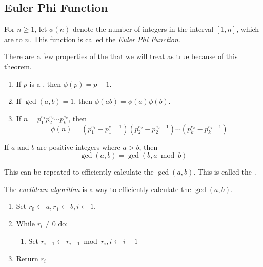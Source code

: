 \subsection{Euler Phi Function}\label{subsec:Euler_Phi_Function}
\begin{definition}\label{def:Euler_Phi_Function}
  For $n \geq 1$, let $\phi(n)$ denote the number of integers in the interval $[1, n]$, which are  to $n$.
  This function is called the \emph{Euler Phi Function}.
\end{definition}
\begin{theorem}\label{thm:Euler_Phi_Function}
  There are a few properties of the  that we will treat as true because of this theorem.
  \begin{enumerate}[noitemsep]
  \item If $p$ is a , then $\phi(p) = p - 1$.
  \item If $\gcd(a, b) = 1$, then $\phi(ab) = \phi(a) \phi(b)$.
  \item If $n = p_{1}^{e_{1}} p_{2}^{e_{2}} \cdots p_{k}^{e_{k}}$, then
    \begin{equation*}
      \phi(n) = \left( p_{1}^{e_{1}} - p_{1}^{e_{1}-1} \right) \left( p_{2}^{e_{2}} - p_{2}^{e_{2}-1} \right) \cdots \left( p_{k}^{e_{k}} - p_{k}^{e_{k}-1} \right)
    \end{equation*}
  \end{enumerate}
\end{theorem}

\begin{lemma}\label{lemma:Compute_GCD}
  If $a$ and $b$ are positive integers where $a > b$, then
  \begin{equation}\label{eq:Compute_GCD}
    \gcd(a, b) = \gcd(b, a \bmod b)
  \end{equation}
  \begin{remark*}
    This can be repeated to efficiently calculate the $\gcd(a, b)$.
    This is called the .
  \end{remark*}
\end{lemma}

\begin{definition}\label{def:Euclidean_Algorithm}
  The \emph{euclidean algorithm} is a way to efficiently calculate the $\gcd(a, b)$.
  \begin{enumerate}[noitemsep]
  \item Set $r_{0} \leftarrow a, r_{1} \leftarrow b, i \leftarrow 1$.
  \item While $r_{i} \neq 0$ do:
    \begin{enumerate}[noitemsep]
    \item Set $r_{i+1} \leftarrow r_{i-1} \bmod r_{i}, i \leftarrow i+1$
    \end{enumerate}
  \item Return $r_{i}$
  \end{enumerate}
\end{definition}

